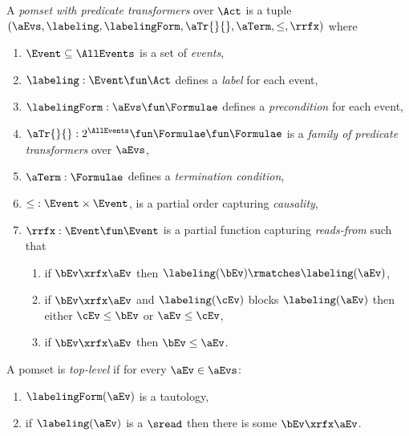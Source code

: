 \begin{definition}
  \label{def:pomset}
  A \emph{pomset with predicate transformers} over $\Act$
  is a tuple $(\aEvs, \labeling, \labelingForm, \aTr{}{}, \aTerm, {\le}, {\rrfx})$ where
  \begin{enumerate}[,label=(\textsc{m}\arabic*),ref=\textsc{m}\arabic*]
  \item \label{pom-E}
    $\Event\subseteq\AllEvents$ is a set of \emph{events},
  \item \label{pom-lambda}
    $\labeling: \Event \fun \Act$ defines a \emph{label} for each event,
  \item \label{pom-kappa}
    $\labelingForm:\aEvs\fun\Formulae$ defines a \emph{precondition} for each event,
  \item \label{pom-tau}
    $\aTr{}{}:2^{\AllEvents}\fun\Formulae \fun\Formulae$ is a \emph{family of
      predicate transformers} over $\aEvs$, %
  \item \label{pom-term}
    $\aTerm:\Formulae$ defines a \emph{termination condition},
  \item \label{pom-le}
    ${\le} : \Event\times\Event$, is a partial order capturing \emph{causality},
  \item \label{pom-rf}
    ${\rrfx} : \Event\fun\Event$ is a partial function capturing
    \emph{reads-from} such that 
    \begin{enumerate}
    \item \label{rf-match}
      if $\bEv\xrfx\aEv$ then $\labeling(\bEv) \rmatches \labeling(\aEv)$,
    \item \label{rf-block}
      if $\bEv\xrfx\aEv$ and $\labeling(\cEv)$ blocks $\labeling(\aEv)$ then either $\cEv\le\bEv$ or $\aEv\le\cEv$,
    \item \label{rf-le}
      if $\bEv\xrfx\aEv$ then $\bEv\le\aEv$.
    \end{enumerate}
  \end{enumerate}
\end{definition}

\begin{definition}
  A pomset is \emph{top-level} if for every $\aEv\in\aEvs$:
  \begin{enumerate}[,label=(\textsc{t}\arabic*),ref=\textsc{t}\arabic*]
  \item \label{top-true}
    $\labelingForm(\aEv)$ is a tautology,    
  \item \label{top-rf}
    if $\labeling(\aEv)$ is a $\sread$ then there is some $\bEv\xrfx\aEv$.
  \end{enumerate}
\end{definition}

